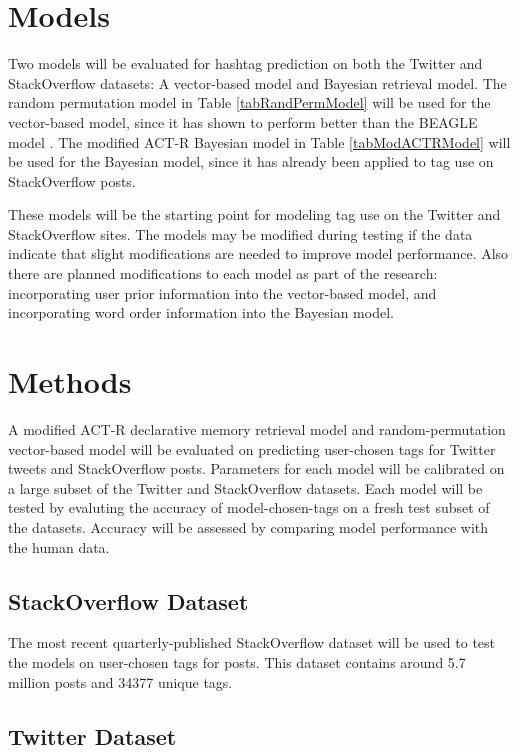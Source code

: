 \documentclass[man,floatsintext]{apa6}
\begin{document}
\section{Models}

Two models will be evaluated for hashtag prediction on both the Twitter and StackOverflow datasets:
A vector-based model and Bayesian retrieval model.
The random permutation model \parencite{Sahlgren2008} in Table \ref{tabRandPermModel} will be used for the vector-based model, since it has shown to perform better than the BEAGLE model \parencite{Recchia2010}.
The modified ACT-R Bayesian model \parencite{Stanley2013} in Table \ref{tabModACTRModel} will be used for the Bayesian model, since it has already been applied to tag use on StackOverflow posts.

These models will be the starting point for modeling tag use on the Twitter and StackOverflow sites.
The models may be modified during testing if the data indicate that slight modifications are needed to improve model performance.
Also there are planned modifications to each model as part of the research:
incorporating user prior information into the vector-based model, and incorporating word order information into the Bayesian model.

\section{Methods}

A modified ACT-R declarative memory retrieval model and random-permutation vector-based model will be evaluated on predicting user-chosen tags for Twitter tweets and StackOverflow posts.
Parameters for each model will be calibrated on a large subset of the Twitter and StackOverflow datasets.
Each model will be tested by evaluting the accuracy of model-chosen-tags on a fresh test subset of the datasets.
Accuracy will be assessed by comparing model performance with the human data.

\subsection{StackOverflow Dataset}

The most recent quarterly-published StackOverflow dataset \parencite{DataDump2013} will be used to test the models on user-chosen tags for posts.
This dataset contains around \num{5.7} million posts and \num{34377} unique tags.

\subsection{Twitter Dataset}
\end{document}
